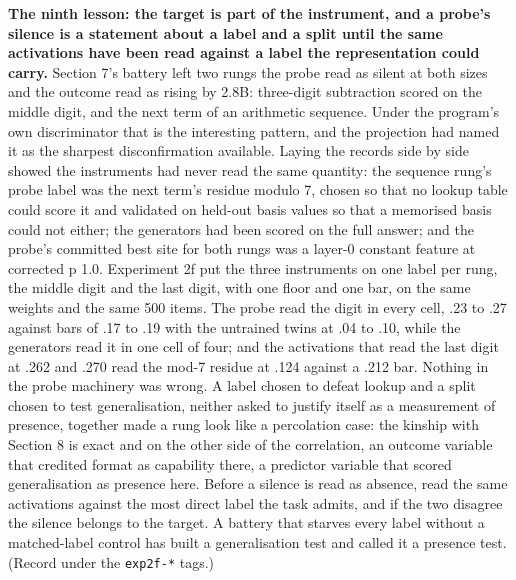\textbf{The ninth lesson: the target is part of the instrument, and a
probe's silence is a statement about a label and a split until the
same activations have been read against a label the representation
could carry.} Section 7's battery left two rungs the probe read as
silent at both sizes and the outcome read as rising by 2.8B:
three-digit subtraction scored on the middle digit, and the next term
of an arithmetic sequence. Under the program's own discriminator that
is the interesting pattern, and the projection had named it as the
sharpest disconfirmation available. Laying the records side by side
showed the instruments had never read the same quantity: the sequence
rung's probe label was the next term's residue modulo 7, chosen so
that no lookup table could score it and validated on held-out basis
values so that a memorised basis could not either; the generators had
been scored on the full answer; and the probe's committed best site
for both rungs was a layer-0 constant feature at corrected p 1.0.
Experiment 2f put the three instruments on one label per rung, the
middle digit and the last digit, with one floor and one bar, on the
same weights and the same 500 items. The probe read the digit in every
cell, .23 to .27 against bars of .17 to .19 with the untrained twins
at .04 to .10, while the generators read it in one cell of four; and
the activations that read the last digit at .262 and .270 read the
mod-7 residue at .124 against a .212 bar. Nothing in the probe
machinery was wrong. A label chosen to defeat lookup and a split
chosen to test generalisation, neither asked to justify itself as a
measurement of presence, together made a rung look like a percolation
case: the kinship with Section 8 is exact and on the other side of the
correlation, an outcome variable that credited format as capability
there, a predictor variable that scored generalisation as presence
here. Before a silence is read as absence, read the same activations
against the most direct label the task admits, and if the two disagree
the silence belongs to the target. A battery that starves every label
without a matched-label control has built a generalisation test and
called it a presence test. (Record under the \texttt{exp2f-*} tags.)

